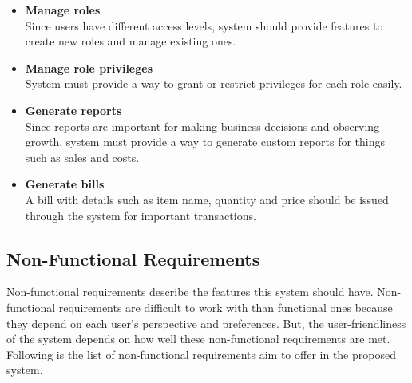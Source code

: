 \documentclass[12pt]{report}
\begin{document}
\begin{itemize}
	\item {\bf{Manage roles}} \\
	      Since users have different access levels, system should provide features to create new roles and manage existing ones.

	\item {\bf{Manage role privileges}} \\
	      System must provide a way to grant or restrict privileges for each role easily.

	\item {\bf{Generate reports}} \\
	      Since reports are important for making business decisions and observing growth, system must provide a way to generate custom reports for things such as sales and costs.

	\item {\bf{Generate bills}} \\
	      A bill with details such as item name, quantity and price should be issued through the system for important transactions.

\end{itemize}

\subsection{Non-Functional Requirements}
Non-functional requirements describe the features this system should have. Non-functional requirements are difficult to work with than functional ones because they depend on each user's perspective and preferences. But, the user-friendliness of the system depends on how well these non-functional requirements are met. Following is the list of non-functional requirements aim to offer in the proposed system.
\end{document}
